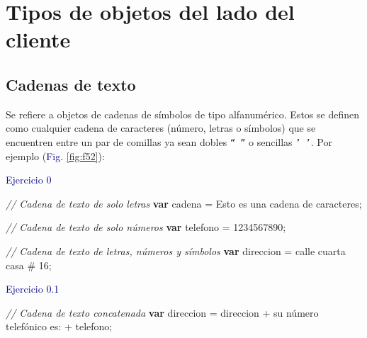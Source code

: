 \documentclass[
  12pt,
  letterpaper,
  twoside]{book}
\newenvironment{Shaded}{\begin{snugshade}}{\end{snugshade}}
\newcommand{\CommentTok}[1]{\textcolor[rgb]{0.24,0.58,0.00}{\textit{#1}}}
\newcommand{\KeywordTok}[1]{\textcolor[rgb]{0.00,0.00,0.00}{\textbf{#1}}}
\newcommand{\NormalTok}[1]{#1}
\newcommand{\OperatorTok}[1]{\textcolor[rgb]{0.00,0.00,0.00}{#1}}
\newcommand{\StringTok}[1]{\textcolor[rgb]{0.87,0.29,0.22}{#1}}
\begin{document}
\hypertarget{tipos-de-objetos-del-lado-del-cliente}{%
\section{Tipos de objetos del lado del cliente}\label{tipos-de-objetos-del-lado-del-cliente}}

\hypertarget{cadenas-de-texto}{%
\subsection*{Cadenas de texto}\label{cadenas-de-texto}}

Se refiere a objetos de cadenas de símbolos de tipo alfanumérico. Estos se definen como cualquier cadena de caracteres (número, letras o símbolos) que se encuentren entre un par de comillas ya sean dobles \texttt{“\ ”} o sencillas \texttt{’\ ’}. Por ejemplo (\textcolor{darkblue}{Fig.} \ref{fig:f52}):

\textcolor{darkblue}{Ejercicio 0}

\begin{Shaded}
\begin{Highlighting}[]
\CommentTok{// Cadena de texto de solo letras}
\KeywordTok{var}\NormalTok{ cadena }\OperatorTok{=} \StringTok{\textquotesingle{}Esto es una cadena de caracteres\textquotesingle{}}\OperatorTok{;}

\CommentTok{// Cadena de texto de solo números}
\KeywordTok{var}\NormalTok{ telefono }\OperatorTok{=} \StringTok{\textquotesingle{}1234567890\textquotesingle{}}\OperatorTok{;}  
                     
\CommentTok{// Cadena de texto de letras, números y símbolos}
\KeywordTok{var}\NormalTok{ direccion }\OperatorTok{=} \StringTok{\textquotesingle{}calle cuarta casa \# 16\textquotesingle{}}\OperatorTok{;}
\end{Highlighting}
\end{Shaded}

\newpage

\textcolor{darkblue}{Ejercicio 0.1}

\begin{Shaded}
\begin{Highlighting}[]
\CommentTok{// Cadena de texto concatenada}
\KeywordTok{var}\NormalTok{ direccion }\OperatorTok{=}\NormalTok{ direccion }\OperatorTok{+} \StringTok{\textquotesingle{} su número telefónico es:\textquotesingle{}} \OperatorTok{+}\NormalTok{ telefono}\OperatorTok{;}
\end{Highlighting}
\end{Shaded}
\end{document}
